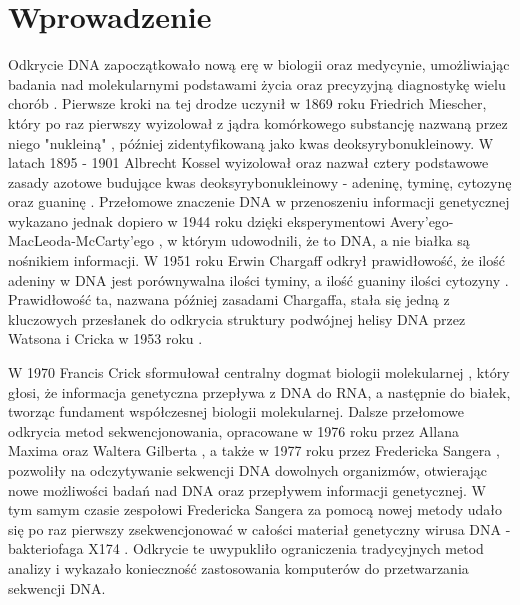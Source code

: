 \clearpage


\section{Wprowadzenie}

Odkrycie DNA zapoczątkowało nową erę w biologii oraz medycynie, umożliwiając badania
nad molekularnymi podstawami życia oraz precyzyjną 
diagnostykę wielu chorób \cite{Louie:2000}. Pierwsze kroki na tej drodze uczynił w 1869 roku 
Friedrich Miescher, który po raz pierwszy wyizolował z jądra komórkowego substancję 
nazwaną przez niego "nukleiną" \cite{Dahm:2005}, później zidentyfikowaną jako kwas deoksyrybonukleinowy. 
W latach 1895 - 1901 Albrecht Kossel wyizolował oraz nazwał cztery podstawowe zasady 
azotowe budujące kwas deoksyrybonukleinowy - adeninę, tyminę, cytozynę oraz guaninę \cite{Kossel:1893}.
Przełomowe znaczenie DNA w przenoszeniu informacji genetycznej wykazano jednak dopiero 
w 1944 roku dzięki eksperymentowi Avery'ego-MacLeoda-McCarty'ego \cite{Avery:1944}, w którym udowodnili, 
że to DNA, a nie białka są nośnikiem informacji. 
W 1951 roku Erwin Chargaff odkrył prawidłowość, że ilość adeniny w DNA jest porównywalna
ilości tyminy, a ilość guaniny ilości cytozyny \cite{Chargaff:1952}. Prawidłowość ta, nazwana później zasadami
Chargaffa, stała się jedną z kluczowych przesłanek do odkrycia struktury podwójnej helisy 
DNA przez Watsona i Cricka w 1953 roku \cite{Watson:1953}.

W 1970 Francis Crick sformułował centralny dogmat biologii molekularnej \cite{Crick:1970}, który głosi,
że informacja genetyczna przepływa z DNA do RNA, a następnie do białek, tworząc 
fundament współczesnej biologii molekularnej. Dalsze przełomowe odkrycia metod sekwencjonowania,
opracowane w 1976 roku przez Allana Maxima oraz Waltera Gilberta \cite{Maxam:1977}, a także w 1977 roku 
przez Fredericka Sangera \cite{Sanger:1977}, pozwoliły na odczytywanie sekwencji DNA dowolnych organizmów, 
otwierając nowe możliwości badań nad DNA oraz przepływem informacji genetycznej. 
W tym samym czasie zespołowi Fredericka Sangera za pomocą nowej metody udało się 
po raz pierwszy zsekwencjonować w całości materiał genetyczny wirusa DNA - 
bakteriofaga  X174 \cite{Sanger:1977_2}. Odkrycie te uwypukliło ograniczenia tradycyjnych metod  %
analizy i wykazało konieczność zastosowania komputerów do przetwarzania sekwencji DNA. \cite{Staden:197 9}

